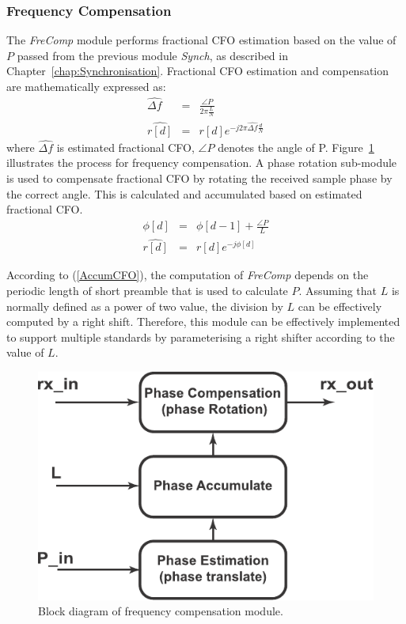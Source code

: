 \subsubsection{Frequency Compensation}
The \emph{FreComp} module performs fractional CFO estimation based on the value of $P$ passed from the previous module \emph{Synch}, as described in Chapter~\ref{chap:Synchronisation}.
Fractional CFO estimation and compensation are mathematically expressed as:
\begin{eqnarray}
\label{fractionalCFO}
\widehat{\Delta f } &=& \frac{\angle P}{2\pi \frac{L}{N}} \nonumber \\
\widehat{r[d]} &=& r[d] e^{-j2\pi\widehat{\Delta f} \frac{d}{N}}
\end{eqnarray}
where $\widehat{\Delta f }$ is estimated fractional CFO, $\angle P$ denotes the angle of P.
Figure~\ref{fig:FFO} illustrates the process for frequency compensation.
A phase rotation sub-module is used to compensate fractional CFO by rotating the received sample phase by the correct angle.
This is calculated and accumulated based on estimated fractional CFO.
\begin{eqnarray}
\label{AccumCFO}
\phi[d] &=& \phi[d-1] + \frac{\angle P}{L} \nonumber \\
\widehat{r[d]} &=& r[d] e^{-j \phi[d]}
\end{eqnarray}

According to (\ref{AccumCFO}), the computation of \emph{FreComp} depends on the periodic length of short preamble that is used to calculate $P$.
Assuming that $L$ is normally defined as a power of two value, the division by $L$ can be effectively computed by a right shift.
Therefore, this module can be effectively implemented to support multiple standards by parameterising a right shifter according to the value of $L$.
\begin{figure}
\centering
\includegraphics [width=0.4\columnwidth]{Figures/MSCR_RX_FFO.pdf}
\caption{Block diagram of frequency compensation module.}
\label{fig:FFO}
\end{figure}


